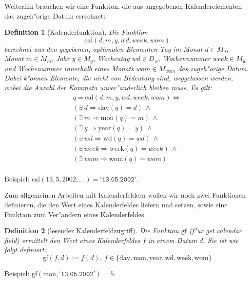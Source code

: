 \documentclass[a4paper]{article}
\newcommand*{\dayf}{\mathrm{day}}
\newcommand*{\monf}{\mathrm{mon}}
\newcommand*{\yearf}{\mathrm{year}}
\newcommand*{\wdf}{\mathrm{wd}}
\newcommand*{\weekf}{\mathrm{week}}
\newcommand*{\womf}{\mathrm{wom}}
\newcommand*{\calf}{\mathrm{cal}}
\newcommand*{\datev}[1]{\texttt{`#1'}}
\newcommand*{\gff}{\mathrm{gf}}
\numberwithin{equation}{section}
\newtheorem{dfn}{Definition}
\begin{document}
Weiterhin brauchen wir eine Funktion, die aus angegebenen Kalenderelementen das
zugeh"orige Datum errechnet:
\begin{dfn}[Kalenderfunktion]
  Die Funktion
  \begin{equation*}\calf(d, m, y, wd, week, wom)\end{equation*}
  berechnet aus den gegebenen, optionalen Elementen Tag im Monat $d \in M_d$,
  Monat $m \in M_m$, Jahr $y \in M_y$, Wochentag $wd \in D_w$, Wochennummer
  $week \in M_w$ und Wochenummer innerhalb eines Monats $wom \in M_{wom}$ das
  zugeh"orige Datum. Dabei k"onnen Elemente, die nicht von Bedeutung sind,
  weggelassen werden, wobei die Anzahl der Kommata unver"anderlich bleiben muss.
  Es gilt:
  \begin{multline}
  q = \calf(d, m, y, wd, week, wom) \Leftrightarrow \\
    (\exists\ d \Rightarrow \dayf(q) = d)\ \wedge \\
    (\exists\ m \Rightarrow \monf(q) = m)\ \wedge \\
    (\exists\ y \Rightarrow \yearf(q) = y)\ \wedge \\
    (\exists\ wd \Rightarrow \wdf(q) = wd)\ \wedge \\
    (\exists\ week \Rightarrow \weekf(q) = week)\ \wedge \\
    (\exists\ wom \Rightarrow \womf(q) = wom) \\
  \end{multline}
\end{dfn}
\noindent Beispiel: $\calf(13, 5, 2002, , ,) = \datev{13.05.2002}$.

Zum allgemeinen Arbeiten mit Kalenderfeldern wollen wir noch zwei Funktionen
definieren, die den Wert eines Kalenderfeldes liefern und setzen, sowie eine
Funktion zum Ver"andern eines Kalenderfeldes.
\begin{dfn}[lesender Kalenderfeldzugriff]
  Die Funktion $\gff$ (f"ur \emph{get calendar field}) ermittelt den Wert eines
  Kalenderfeldes $f$ in einem Datum $d$. Sie ist wie folgt definiert:
  \begin{equation}
    \gff(f, d) := f(d),\ f \in \{\dayf, \monf, \yearf, \wdf, \weekf, \womf\}
  \end{equation}
\end{dfn}
\noindent Beispiel: $\gff(\monf, \datev{13.05.2002}) = 5$.
\end{document}

